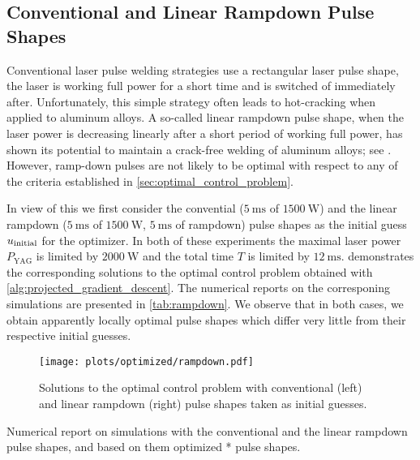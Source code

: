 \subsection{Conventional and Linear Rampdown Pulse Shapes}

Conventional laser pulse welding strategies use a rectangular laser pulse shape, \ie the laser is working full power for a short time and is switched of immediately after. 
Unfortunately, this simple strategy often leads to hot-cracking when applied to aluminum alloys.
A so-called linear rampdown pulse shape, \ie when the laser power is decreasing linearly after a short period of working full power, has shown its potential to maintain a crack-free welding of aluminum alloys; see \cite{JiaZhangYuShiLiuWuYeWangTian:2021:1}.
However, ramp-down pulses are not likely to be optimal with respect to any of the criteria established in \cref{sec:optimal_control_problem}.

In view of this we first consider the convential ($\SI{5}{\ms}$ of $\SI{1500}{\W}$) and the linear rampdown ($\SI{5}{\ms}$ of $\SI{1500}{\W}$, $\SI{5}{\ms}$ of rampdown) pulse shapes as the initial guess $u_\textup{initial}$ for the optimizer. In both of these experiments the maximal laser power $P_\text{YAG}$ is limited by $\SI{2000}{\W}$ and the total time $T$ is limited by $\SI{12}{\ms}$.
 demonstrates the corresponding solutions to the optimal control problem obtained with \cref{alg:projected_gradient_descent}.
The numerical reports on the corresponing simulations are presented in \cref{tab:rampdown}.
We observe that in both cases, we obtain apparently locally optimal pulse shapes which differ very little from their respective initial guesses.

\begin{figure} 
	\centering
	\texttt{[image: plots/optimized/rampdown.pdf]}
	\caption{Solutions to the optimal control problem with conventional (left) and linear rampdown (right) pulse shapes taken as initial guesses.}
	\label{fig:rampdown}
\end{figure}

\begin{table} 
	\centering
	
	\caption{Numerical report on simulations with the conventional and the linear rampdown pulse shapes, and based on them optimized * pulse shapes.}
	\label{tab:rampdown}
\end{table}



